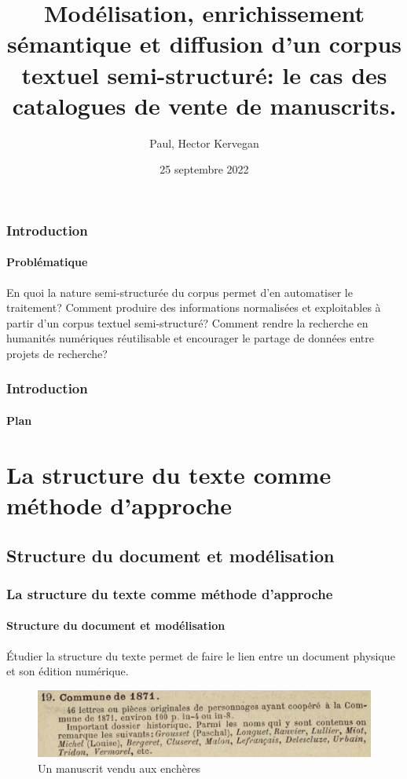 \documentclass{beamer}
\title{Modélisation, enrichissement sémantique et diffusion d'un corpus textuel semi-structuré: le cas des catalogues de vente de manuscrits.}
\date{25 septembre 2022}
\author[Paul H. Kervegan]{Paul, Hector Kervegan}
\begin{document}
	

\begin{frame}
	\titlepage
\end{frame}

\begin{frame}
	\frametitle{Introduction}
	\framesubtitle{Problématique}
	
	En quoi la nature semi-structurée du corpus permet d'en automatiser le traitement? Comment produire des informations normalisées et exploitables à partir d'un corpus textuel semi-structuré? Comment rendre la recherche en humanités numériques réutilisable et encourager le partage de données entre projets de recherche?
\end{frame}

\begin{frame}
	\frametitle{Introduction}
	\framesubtitle{Plan}
	\tableofcontents
\end{frame}


\section{La structure du texte comme méthode d'approche}
\subsection{Structure du document et modélisation}
\begin{frame}
	\frametitle{La structure du texte comme méthode d'approche}
	\framesubtitle{Structure du document et modélisation}
	
	Étudier la structure du texte permet de faire le lien entre un document physique et son édition numérique.
	
	
	\begin{figure}[h]
		\centering
		\includegraphics[width=\textwidth]{includes/tei_item.png}
		\caption{Un manuscrit vendu aux enchères}
	\end{figure}
\end{frame}
\end{document}

